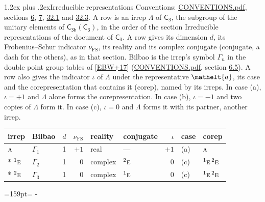 \documentclass[10pt,a4paper]{article}
\makeatletter
\renewcommand\section{\@startsection{section}{1}{\z@}{-3ex plus -1ex minus -.2ex}%
  {1.2ex plus .2ex}{\normalfont\large\sffamily\bfseries\color{parttitle}}}
\newcommand{\needspace}[1]{\par\penalty-100\begingroup\dimen0=#1\relax\dimen2=\pagegoal
  \advance\dimen2-\pagetotal\ifdim\dimen0>\dimen2\relax\ifdim\dimen2>0pt\vfil\break\fi\fi
  \endgroup}
\numberwithin{equation}{section}
\newcommand{\eltfont}[1]{{\let\sigma\eltsigma\mathelt{#1}}}
\newcommand{\grp}[1]{\mathsf{#1}}
\newcommand{\irr}[1]{\text{\normalfont\scshape #1}}
\newcommand{\conjpair}[1]{{}^{#1}}
\newcommand{\elt}[1]{\eltfont{#1}}
\newcommand{\fsind}{\nu_{\mathrm{FS}}}
\makeatother
\begin{document}
\section{Irreducible representations}\label{s:irreps}
Conventions: \href{../../CONVENTIONS.pdf}{CONVENTIONS.pdf}, sections \href{../../../rotation/CONVENTIONS.pdf\#conv.6}{6}, \href{../../../rotation/CONVENTIONS.pdf\#conv.7}{7}, \href{../../CONVENTIONS.pdf\#conv.32.1}{32.1} and \href{../../CONVENTIONS.pdf\#conv.32.3}{32.3}.
\leavevmode\label{n:irrep.Delta}A row is an irrep $\Lambda$ of $\grp{C_{3}}$, the subgroup of the unitary elements of $\grp{C_{3h}}(\grp{C_{3}})$, in the order of the section Irreducible representations of the document of \href{../../../rotation/data/pdf/C3.pdf}{$\grp{C_{3}}$}. \label{n:index.dimension}\label{n:index.frobenius}\label{n:head.irrep}\label{n:head.reality}\label{n:head.conjugate}A row gives its dimension $d$, its Frobenius--Schur indicator $\fsind$, its reality and its complex conjugate (conjugate, a dash for the others), as in that section. \label{n:head.bilbao}\label{n:irrep.alias.gamma}Bilbao is the irrep's symbol $\Gamma_n$ in the double point group tables of [\href{../../../REFERENCES.pdf\#ref.EBW+17}{EBW+17}] (\href{../../CONVENTIONS.pdf}{CONVENTIONS.pdf}, section \href{../../../rotation/CONVENTIONS.pdf\#conv.6.5}{6.5}). \label{n:head.case.corep}\label{n:head.corep}A row also gives the indicator $\iota$ of $\Lambda$ under the representative $\elt{a}$, its case and the corepresentation that contains it (corep), named by its irreps. In case (a), $\iota = +1$ and $\Lambda$ alone forms the corepresentation. In case (b), $\iota = -1$ and two copies of $\Lambda$ form it. In case (c), $\iota = 0$ and $\Lambda$ forms it with its partner, another irrep.
\setlength{\emergencystretch}{2em}\par\setlength{\emergencystretch}{0pt}
{\small\renewcommand{\arraystretch}{1.25}\setlength{\tabcolsep}{4pt}\begin{longtable}{@{}llrrllrll@{}}\toprule
irrep & Bilbao & $d$ & $\fsind$ & reality & conjugate & $\iota$ & case & corep\\\midrule\endhead
\bottomrule\endfoot\endlastfoot
$\irr{a}$ & $\Gamma_{1}$ & 1 & $+1$ & real & --- & $+1$ & (a) & $\irr{a}$\\*
$\conjpair{1}\irr{e}$ & $\Gamma_{2}$ & 1 & $0$ & complex & $\conjpair{2}\irr{e}$ & $0$ & (c) & $\conjpair{1}\irr{e}\,\conjpair{2}\irr{e}$\\*
$\conjpair{2}\irr{e}$ & $\Gamma_{3}$ & 1 & $0$ & complex & $\conjpair{1}\irr{e}$ & $0$ & (c) & $\conjpair{1}\irr{e}\,\conjpair{2}\irr{e}$\\
\bottomrule\end{longtable}}
\needspace{159pt}
\end{document}
